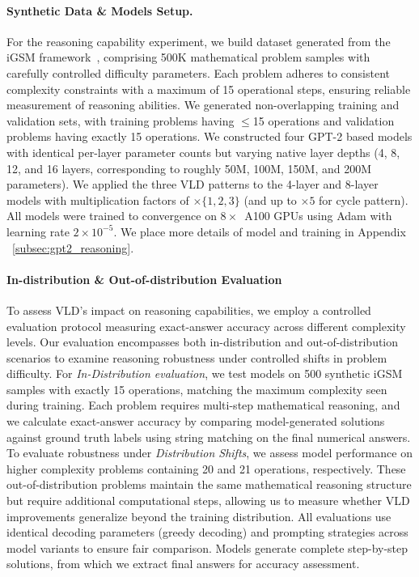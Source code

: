 \documentclass{article} %
\begin{document}
\paragraph{Synthetic Data \& Models Setup.}
For the reasoning capability experiment, we build dataset generated from the iGSM framework~\citep{ye2024physics}, comprising 500K mathematical problem samples with carefully controlled difficulty parameters. Each problem adheres to consistent complexity constraints with a maximum of 15 operational steps, ensuring reliable measurement of reasoning abilities. We generated non-overlapping training and validation sets, with training problems having $\leq$15 operations and validation problems having exactly 15 operations. We constructed four GPT-2 based models with identical per-layer parameter counts but varying native layer depths (4, 8, 12, and 16 layers, corresponding to roughly 50M, 100M, 150M, and 200M parameters). We applied the three VLD patterns to the 4-layer and 8-layer models with multiplication factors of $\times\{1,2,3\}$ (and up to $\times 5$ for cycle pattern). All models were trained to convergence on $8\times$~A100 GPUs using Adam with learning rate $2{\times}10^{-5}$. We place more details of model and training in Appendix ~\ref{subsec:gpt2_reasoning}. 

\paragraph{In-distribution \& Out-of-distribution Evaluation}

To assess VLD's impact on reasoning capabilities, we employ a controlled evaluation protocol measuring exact-answer accuracy across different complexity levels. Our evaluation encompasses both in-distribution and out-of-distribution scenarios to examine reasoning robustness under controlled shifts in problem difficulty. For \textit{In-Distribution evaluation}, we test models on 500 synthetic iGSM samples with exactly 15 operations, matching the maximum complexity seen during training. Each problem requires multi-step mathematical reasoning, and we calculate exact-answer accuracy by comparing model-generated solutions against ground truth labels using string matching on the final numerical answers. To evaluate robustness under \textit{Distribution Shifts}, we assess model performance on higher complexity problems containing 20 and 21 operations, respectively. These out-of-distribution problems maintain the same mathematical reasoning structure but require additional computational steps, allowing us to measure whether VLD improvements generalize beyond the training distribution. All evaluations use identical decoding parameters (greedy decoding) and prompting strategies across model variants to ensure fair comparison. Models generate complete step-by-step solutions, from which we extract final answers for accuracy assessment.
\end{document}
